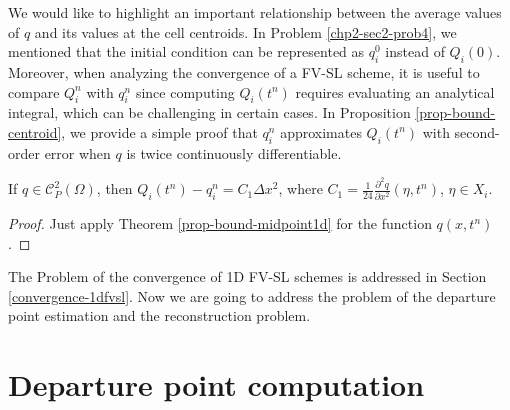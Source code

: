 We would like to highlight an important relationship between the average values of $q$ and
its values at the cell centroids. In Problem \ref{chp2-sec2-prob4}, we mentioned that 
the initial condition can be represented as $q_i^0$ instead of $Q_i(0)$.
Moreover, when analyzing the convergence of a FV-SL scheme, it is useful
to compare $Q_i^n$ with $q_i^n$ since computing $Q_i(t^n)$ requires evaluating an analytical
integral, which can be challenging in certain cases. In Proposition \ref{prop-bound-centroid},
we provide a simple proof that $q_i^n$ approximates $Q_i(t^n)$ with second-order error
when $q$ is twice continuously differentiable.
\begin{prop}
	\label{prop-bound-centroid}
	If $q \in \mathcal{C}^2_P(\Omega)$, then $Q_i(t^n)-q_i^n = C_1 \Delta x^2$, where 
	$C_1 = \frac{1}{24}\frac{\partial^2 q}{\partial x^2} (\eta, t^n)$,  $\eta \in X_i$.
\end{prop}
\begin{proof}
	Just apply Theorem \ref{prop-bound-midpoint1d} for the function $q(x,t^n)$.	
\end{proof}
The Problem of the convergence of 1D FV-SL schemes is addressed in Section \ref{convergence-1dfvsl}.
Now we are going to address the problem of the departure point estimation and the reconstruction problem.

\section{Departure point computation}
\label{chp2-sec-dp}
